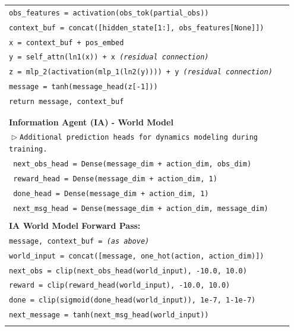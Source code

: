 \documentclass[letterpaper]{article} %
\begin{document}
\begin{appendix}
\begin{table}[!htbp]
\begin{tabular}{@{}p{0.95\linewidth}@{}}
\texttt{obs\_features = activation(obs\_tok(partial\_obs))} \\
\texttt{context\_buf = concat([hidden\_state[1:], obs\_features[None]])} \\
\texttt{x = context\_buf + pos\_embed} \\
\texttt{y = self\_attn(ln1(x)) + x  \quad \textit{(residual connection)}} \\
\texttt{z = mlp\_2(activation(mlp\_1(ln2(y)))) + y  \quad \textit{(residual connection)}} \\
\texttt{message = tanh(message\_head(z[-1]))} \\
\texttt{return message, context\_buf} \\
\\ \hline \\
\textbf{Information Agent (IA) - World Model} \\
\texttt{$\vartriangleright$\hspace{0.5em}Additional prediction heads for dynamics modeling during training.} \\
\texttt{  next\_obs\_head = Dense(message\_dim + action\_dim, obs\_dim)} \\
\texttt{  reward\_head = Dense(message\_dim + action\_dim, 1)} \\
\texttt{  done\_head = Dense(message\_dim + action\_dim, 1)} \\
\texttt{  next\_msg\_head = Dense(message\_dim + action\_dim, message\_dim)} \\
\\
\textbf{IA World Model Forward Pass:} \\
\texttt{message, context\_buf = \textit{(as above)}} \\
\texttt{world\_input = concat([message, one\_hot(action, action\_dim)])} \\
\texttt{next\_obs = clip(next\_obs\_head(world\_input), -10.0, 10.0)} \\
\texttt{reward = clip(reward\_head(world\_input), -10.0, 10.0)} \\
\texttt{done = clip(sigmoid(done\_head(world\_input)), 1e-7, 1-1e-7)} \\
\texttt{next\_message = tanh(next\_msg\_head(world\_input))} \\
\\
\bottomrule[\heavyrulewidth]
\end{tabular}
\end{table}



\end{appendix}
\end{document}
